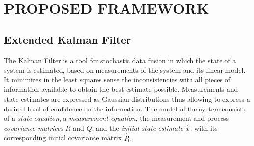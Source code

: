 \documentclass[letterpaper, 10 pt, conference]{ieeeconf}  %
\begin{document}

% 
% 
% 
% 
% 
% 
% 

\section{PROPOSED FRAMEWORK}
\label{section:framework}

\subsection{Extended Kalman Filter}
\label{subsection:extended-kalman-filter}
The Kalman Filter is a tool for stochastic data fusion in which the state of a system is estimated, based on measurements of the system and its linear model. It minimizes in the least squares sense the inconsistencies with all pieces of information available to obtain the best estimate possible. Measurements and state estimates are expressed as Gaussian distributions thus allowing to express a desired level of confidence on the information. The model of the system consists of a \emph{state equation}, a \emph{measurement equation}, the measurement and process \emph{covariance matrices} $R$ and $Q$, and the \emph{initial state estimate} $\hat{x}_0$ with its corresponding initial covariance matrix $\hat{P}_0$.
\end{document}
